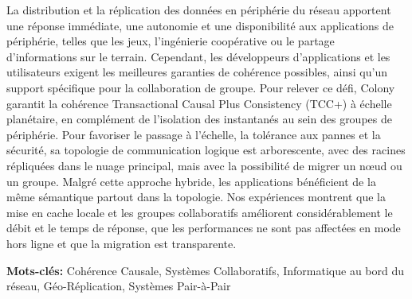 %
\label{chap:résumé}

\vspace*{8mm}
La distribution et la réplication des données en périphérie du réseau apportent une réponse immédiate, une autonomie et une disponibilité aux applications de périphérie, telles que les jeux, l'ingénierie coopérative ou le partage d'informations sur le terrain. Cependant, les développeurs d'applications et les utilisateurs exigent les meilleures garanties de cohérence possibles, ainsi qu'un support spécifique pour la collaboration de groupe. Pour relever ce défi, Colony garantit la cohérence Transactional Causal Plus Consistency (TCC+) à échelle planétaire, en complément de l'isolation des instantanés au sein des groupes de périphérie. Pour favoriser le passage à l'échelle, la tolérance aux pannes et la sécurité, sa topologie de communication logique est arborescente, avec des racines répliquées dans le nuage principal, mais avec la possibilité de migrer un nœud ou un groupe. Malgré cette approche hybride, les applications bénéficient de la même sémantique partout dans la topologie. Nos expériences montrent que la mise en cache locale et les groupes collaboratifs améliorent considérablement le débit et le temps de réponse, que les performances ne sont pas affectées en mode hors ligne et que la migration est transparente.

\textbf{Mots-clés:} 
Cohérence Causale, Systèmes Collaboratifs, Informatique au bord du réseau,
Géo-Réplication, Systèmes Pair-à-Pair